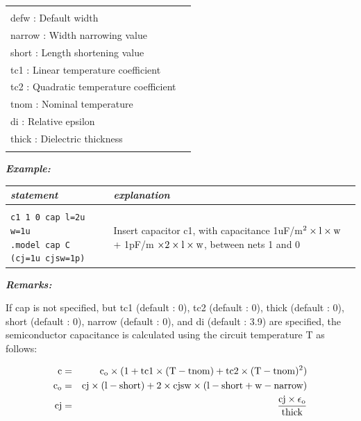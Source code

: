 {\begin{longtable}{l l}
\begin{tabular}{lp{5.5cm}p{5cm}}
																					{\small defl : Default length} \\
																					{\small defw : Default width} \\
																					{\small narrow : Width narrowing value} \\
																					{\small short : Length shortening value} \\
																					{\small tc1 : Linear temperature coefficient} \\
																					{\small tc2 : Quadratic temperature coefficient} \\
																					{\small tnom : Nominal temperature} \\
																					{\small di : Relative epsilon} \\
																					{\small thick : Dielectric thickness} \\
																					\end{tabular}																			
\end{longtable}

\textbf{\textit{Example:}}

\begin{longtable}{l l}
\textit{statement} & \textit{explanation} \\ \hline \\ %
		\parbox{15em}{\texttt{c1 1 0 cap l=2u w=1u} \\
			\texttt{.model cap C (cj=1u cjsw=1p)}} 
			& \parbox{25em}{{\small Insert capacitor c1, with capacitance 
			1uF/m$^{2}\times\rm{l}\times\rm{w}$\\+ 1pF/m $\times{2}\times\rm{l}\times\rm{w}$, between nets 1 and 0}} 
\end{longtable}

\textbf{\textit{Remarks:}}

If cap is not specified, but tc1 (default : 0), tc2 (default : 0), thick (default : 0), short (default : 0), narrow (default : 0), and di (default : 3.9) are specified, the semiconductor capacitance is calculated using the circuit temperature T as follows:

\begin{eqnarray}
\rm{c} &=& \rm{c}_o\times(1+\rm{tc1}\times(\rm{T}-\rm{tnom})+\rm{tc2}\times(\rm{T}-\rm{tnom})^2) \nonumber\\
\rm{c}_o &=& \rm{cj}\times(\rm{l}-\rm{short}) + 2\times\rm{cjsw}\times(\rm{l}-\rm{short}+\rm{w}-\rm{narrow}) \nonumber\\
\rm{cj} &=& \frac{\rm{cj}\times\epsilon_o}{\rm{thick}}\nonumber
\end{eqnarray} 

}
